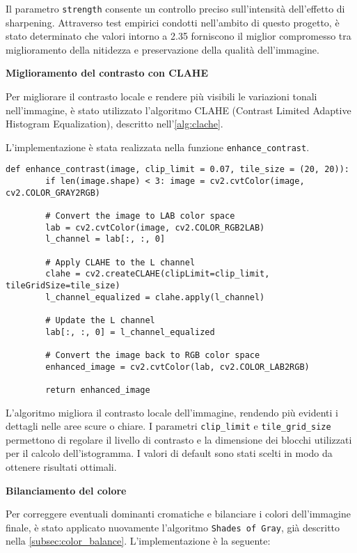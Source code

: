 Il parametro \texttt{strength} consente un controllo preciso sull'intensità dell'effetto di sharpening. Attraverso test empirici condotti nell'ambito di questo progetto, è stato determinato che valori intorno a 2.35 forniscono il miglior compromesso tra miglioramento della nitidezza e preservazione della qualità dell'immagine.

\textbf{Miglioramento del contrasto con CLAHE}

Per migliorare il contrasto locale e rendere più visibili le variazioni tonali nell'immagine, è stato utilizzato l'algoritmo CLAHE (Contrast Limited Adaptive Histogram Equalization), descritto nell'\cref{alg:clache}.

L'implementazione è stata realizzata nella funzione \texttt{enhance\_contrast}.

\begin{lstlisting}[label={lst:clache}]
    def enhance_contrast(image, clip_limit = 0.07, tile_size = (20, 20)):
        if len(image.shape) < 3: image = cv2.cvtColor(image, cv2.COLOR_GRAY2RGB)

        # Convert the image to LAB color space
        lab = cv2.cvtColor(image, cv2.COLOR_RGB2LAB)
        l_channel = lab[:, :, 0]

        # Apply CLAHE to the L channel
        clahe = cv2.createCLAHE(clipLimit=clip_limit, tileGridSize=tile_size)
        l_channel_equalized = clahe.apply(l_channel)

        # Update the L channel
        lab[:, :, 0] = l_channel_equalized

        # Convert the image back to RGB color space
        enhanced_image = cv2.cvtColor(lab, cv2.COLOR_LAB2RGB)

        return enhanced_image
\end{lstlisting}

L'algoritmo migliora il contrasto locale dell'immagine, rendendo più evidenti i dettagli nelle aree scure o chiare. I parametri \texttt{clip\_limit} e \texttt{tile\_grid\_size} permettono di regolare il livello di contrasto e la dimensione dei blocchi utilizzati per il calcolo dell'istogramma. I valori di default sono stati scelti in modo da ottenere risultati ottimali.

\textbf{Bilanciamento del colore}

Per correggere eventuali dominanti cromatiche e bilanciare i colori dell'immagine finale, è stato applicato nuovamente l'algoritmo \texttt{Shades of Gray}, già descritto nella \cref{subsec:color_balance}. L'implementazione è la seguente:

